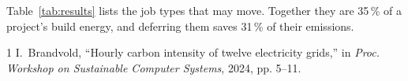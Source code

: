 \documentclass[conference]{IEEEtran}
\begin{document}
Table~\ref{tab:results} lists the job types that may move. Together they are
35\,\% of a project's build energy, and deferring them saves 31\,\% of their
emissions.

\begin{thebibliography}{1}
I.~Brandvold, ``Hourly carbon intensity of twelve electricity grids,'' in
\emph{Proc. Workshop on Sustainable Computer Systems}, 2024, pp. 5--11.
\end{thebibliography}
\end{document}
